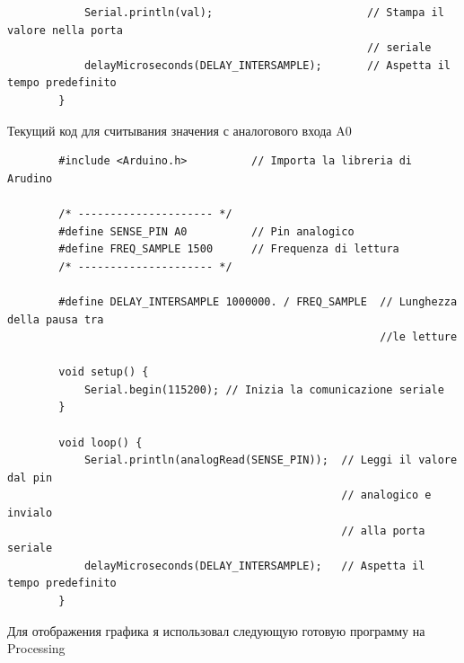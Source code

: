 \documentclass[a4paper, 10pt, final]{article} %
\newcommand{\parenciteit}[2]{\textit{\parencite[#1]{#2}}} %
\begin{document}
\begin{verbatim}
            Serial.println(val);                        // Stampa il valore nella porta
                                                        // seriale
            delayMicroseconds(DELAY_INTERSAMPLE);       // Aspetta il tempo predefinito
        }
    \end{verbatim}

    \noindent Текущий код для считывания значения с аналогового входа A0
    \begin{verbatim}
        #include <Arduino.h>          // Importa la libreria di Arudino

        /* --------------------- */
        #define SENSE_PIN A0          // Pin analogico
        #define FREQ_SAMPLE 1500      // Frequenza di lettura
        /* --------------------- */

        #define DELAY_INTERSAMPLE 1000000. / FREQ_SAMPLE  // Lunghezza della pausa tra
                                                          //le letture

        void setup() {
            Serial.begin(115200); // Inizia la comunicazione seriale
        }

        void loop() {
            Serial.println(analogRead(SENSE_PIN));  // Leggi il valore dal pin 
                                                    // analogico e invialo
                                                    // alla porta seriale
            delayMicroseconds(DELAY_INTERSAMPLE);   // Aspetta il tempo predefinito
        }
    \end{verbatim}

    Для отображения графика я использовал следующую готовую программу на Processing \parenciteit{}{ProcessingGrapher:Software}
\end{document}

